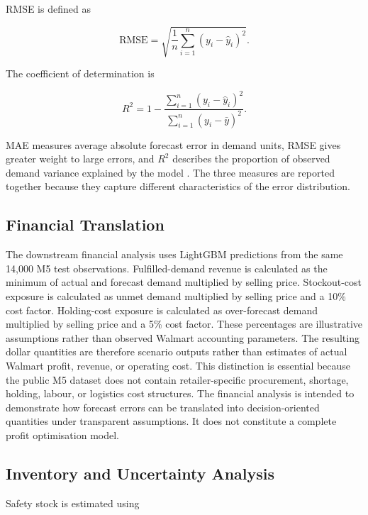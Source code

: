RMSE is defined as

\begin{equation}
\mathrm{RMSE}
=
\sqrt{
\frac{1}{n}
\sum_{i=1}^{n}
(y_i-\hat{y}_i)^2
}.
\label{eq:rmse}
\end{equation}

The coefficient of determination is

\begin{equation}
R^2
=
1-
\frac{
\sum_{i=1}^{n}(y_i-\hat{y}_i)^2
}{
\sum_{i=1}^{n}(y_i-\bar{y})^2
}.
\label{eq:r2}
\end{equation}

MAE measures average absolute forecast error in demand units, RMSE gives greater weight to large errors, and $R^2$ describes the proportion of observed demand variance explained by the model \cite{Petropoulos2022ForecastingTheory}.
The three measures are reported together because they capture different characteristics of the error distribution.

\subsection{Financial Translation}

The downstream financial analysis uses LightGBM predictions from the same 14,000 M5 test observations.
Fulfilled-demand revenue is calculated as the minimum of actual and forecast demand multiplied by selling price.
Stockout-cost exposure is calculated as unmet demand multiplied by selling price and a 10\% cost factor.
Holding-cost exposure is calculated as over-forecast demand multiplied by selling price and a 5\% cost factor.
These percentages are illustrative assumptions rather than observed Walmart accounting parameters.
The resulting dollar quantities are therefore scenario outputs rather than estimates of actual Walmart profit, revenue, or operating cost.
This distinction is essential because the public M5 dataset does not contain retailer-specific procurement, shortage, holding, labour, or logistics cost structures.
The financial analysis is intended to demonstrate how forecast errors can be translated into decision-oriented quantities under transparent assumptions.
It does not constitute a complete profit optimisation model.

\subsection{Inventory and Uncertainty Analysis}

Safety stock is estimated using

